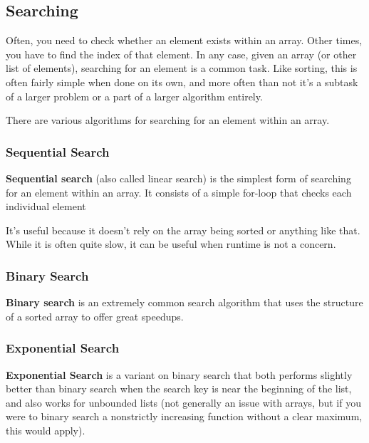 \hrulefill



\subsection{Searching}

Often, you need to check whether an element exists within an array. Other times, you have to find the index of that element. In any case, given an array (or other list of elements), searching for an element is a common task. Like sorting, this is often fairly simple when done on its own, and more often than not it's a subtask of a larger problem or a part of a larger algorithm entirely.

There are various algorithms for searching for an element within an array.

\subsubsection{Sequential Search}
 

\textbf{Sequential search} (also called linear search) is the simplest form of searching for an element within an array. It consists of a simple for-loop that checks each individual element 

It's useful because it doesn't rely on the array being sorted or anything like that. While it is often quite slow, it can be useful when runtime is not a concern.

\subsubsection{Binary Search}

\textbf{Binary search} is an extremely common search algorithm that uses the structure of a sorted array to offer great speedups.

\subsubsection{Exponential Search}

\textbf{Exponential Search} is a variant on binary search that both performs slightly better than binary search when the search key is near the beginning of the list, and also works for unbounded lists (not generally an issue with arrays, but if you were to binary search a nonstrictly increasing function without a clear maximum, this would apply).

